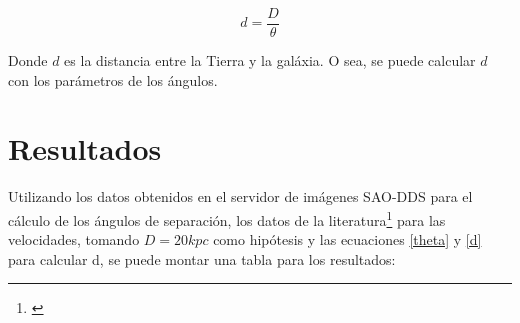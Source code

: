 \documentclass[a4paper,12pt]{article}
\begin{document}
\begin{equation}
    \label{d}
    d = \frac{D}{\theta}
\end{equation}

Donde $d$ es la distancia entre la Tierra y la galáxia. O sea, se puede calcular $d$ 
con los parámetros de los ángulos.

\section{Resultados}

Utilizando los datos obtenidos en el servidor de imágenes SAO-DDS para el 
cálculo de los ángulos de separación, los datos de la literatura\footnote{\cite{literatura}}
para las velocidades, tomando $D=20kpc$ como hipótesis y las ecuaciones 
\eqref{theta} y \eqref{d} para calcular d, se puede montar una tabla para los resultados: 
\end{document}

